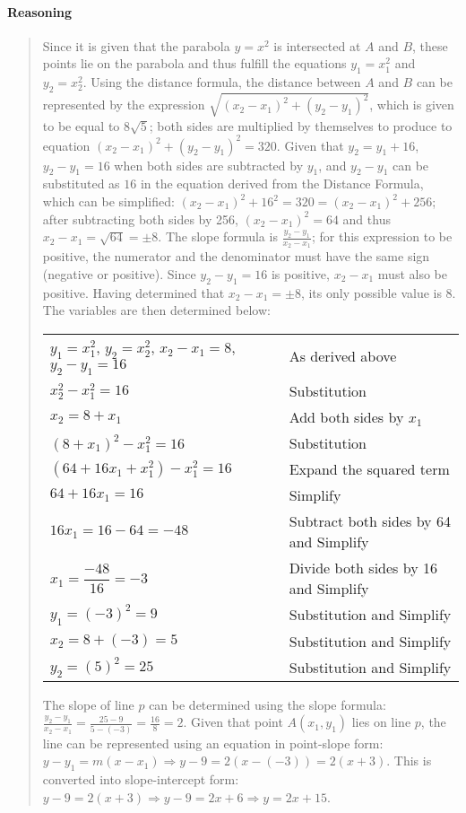 \documentclass[letterpaper,12pt,twoside]{report}
\begin{document}
	\paragraph{Reasoning}
	\begin{quotation}
		
		Since it is given that the parabola $y=x^2$ is intersected at $A$ and $B$, these points lie on the parabola and thus fulfill the equations $y_1=x_1^2$ and $y_2=x_2^2$. Using the distance formula, the distance between $A$ and $B$ can be represented by the expression $\sqrt{(x_2-x_1)^2+(y_2-y_1)^2}$, which is given to be equal to $8\sqrt{5}$; both sides are multiplied by themselves to produce to equation $(x_2-x_1)^2+(y_2-y_1)^2=320$. Given that $y_2=y_1+16$, $y_2-y_1=16$ when both sides are subtracted by $y_1$, and $y_2-y_1$ can be substituted as $16$ in the equation derived from the Distance Formula, which can be simplified: $(x_2-x_1)^2+16^2=320=(x_2-x_1)^2+256$; after subtracting both sides by 256, $(x_2-x_1)^2=64$ and thus $x_2-x_1=\sqrt{64}=\pm 8$. The slope formula is $\frac{y_2-y_1}{x_2-x_1}$; for this expression to be positive, the numerator and the denominator must have the same sign (negative or positive). Since $y_2-y_1=16$ is positive, $x_2-x_1$ must also be positive. Having determined that $x_2-x_1=\pm 8$, its only possible value is $8$. The variables are then determined below:
		\begin{center}
			\begin{tabular}{l | l}
				$y_1=x_1^2$, $y_2=x_2^2$, $x_2-x_1=8$, $y_2-y_1=16$ & As derived above \\
				$x_2^2-x_1^2=16$ & Substitution \\
				$x_2=8+x_1$ & Add both sides by $x_1$ \\
				$(8+x_1)^2-x_1^2=16$ & Substitution \\
				$(64+16x_1+x_1^2)-x_1^2=16$ & Expand the squared term \\
				$64+16x_1=16$ & Simplify \\
				$16x_1=16-64=-48$ & Subtract both sides by 64 and Simplify \\
				$x_1=\dfrac{-48}{16}=-3$ & Divide both sides by 16 and Simplify \\
				$y_1=(-3)^2=9$ & Substitution and Simplify \\
				$x_2=8+(-3)=5$ & Substitution and Simplify \\
				$y_2=(5)^2=25$ & Substitution and Simplify
			\end{tabular}
		\end{center}
	
		The slope of line $p$ can be determined using the slope formula: $\frac{y_2-y_1}{x_2-x_1}=\frac{25-9}{5-(-3)}=\frac{16}{8}=2$. Given that point $A(x_1,y_1)$ lies on line $p$, the line can be represented using an equation in point-slope form: $y-y_1=m(x-x_1) \Rightarrow y-9=2(x-(-3))=2(x+3)$. This is converted into slope-intercept form: $y-9=2(x+3) \Rightarrow y-9=2x+6 \Rightarrow \boxed{y=2x+15}$.
	\end{quotation}
	
\end{document}
